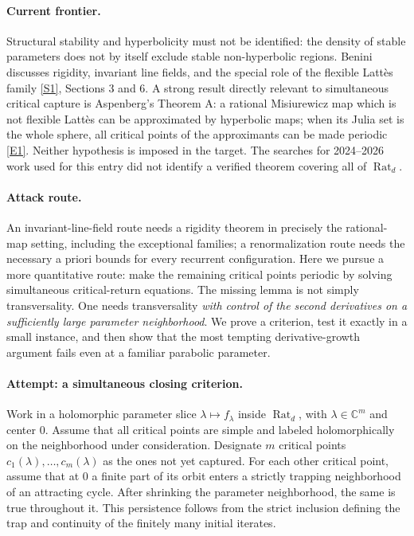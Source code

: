 \documentclass[11pt,a4paper]{article}
\newcommand{\C}{\mathbb{C}}
\newcommand{\sref}[2]{\hyperlink{source:#1:#2}{[S#2]}}
\newcommand{\eref}[2]{\hyperlink{extra:#1:#2}{[E#2]}}
\numberwithin{equation}{section}
\begin{document}
\paragraph{Current frontier.}
Structural stability and hyperbolicity must not be identified: the density
of stable parameters does not by itself exclude stable non-hyperbolic
regions. Benini discusses rigidity, invariant line fields, and the special
role of the flexible Latt\`es family \sref{30006757}{1}, Sections 3 and 6.
A strong result directly relevant to simultaneous critical capture is
Aspenberg's Theorem A: a rational Misiurewicz map which is not flexible
Latt\`es can be approximated by hyperbolic maps; when its Julia set is the
whole sphere, all critical points of the approximants can be made periodic
\eref{30006757}{1}. Neither hypothesis is imposed in the target. The searches
for 2024--2026 work used for this entry did not identify a verified theorem
covering all of $\operatorname{Rat}_d$.

\paragraph{Attack route.}
An invariant-line-field route needs a rigidity theorem in precisely the
rational-map setting, including the exceptional families; a
renormalization route needs the necessary a priori bounds for every
recurrent configuration. Here we pursue a more quantitative route: make the
remaining critical points periodic by solving simultaneous critical-return
equations. The missing lemma is not simply transversality. One needs
transversality \emph{with control of the second derivatives on a sufficiently
large parameter neighborhood}. We prove a criterion, test it exactly in a
small instance, and then show that the most tempting derivative-growth
argument fails even at a familiar parabolic parameter.

\paragraph{Attempt: a simultaneous closing criterion.}
Work in a holomorphic parameter slice $\lambda\mapsto f_\lambda$ inside
$\operatorname{Rat}_d$, with $\lambda\in\C^m$ and center $0$. Assume that
all critical points are simple and labeled holomorphically on the
neighborhood under consideration. Designate $m$ critical points
$c_1(\lambda),\ldots,c_m(\lambda)$ as the ones not yet captured. For each
other critical point, assume that at $0$ a finite part of its orbit enters
a strictly trapping neighborhood of an attracting cycle. After shrinking
the parameter neighborhood, the same is true throughout it. This
persistence follows from the strict inclusion defining the trap and
continuity of the finitely many initial iterates.
\end{document}
